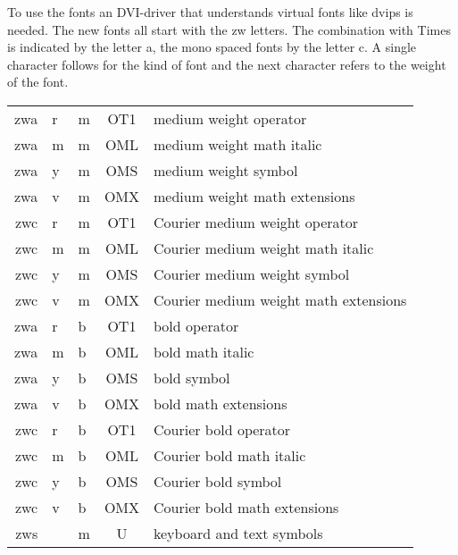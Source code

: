 \documentclass{article}
\begin{document}
To use the fonts an DVI-driver that understands virtual fonts like 
\textsf{dvips} is needed.
The new fonts all start with the \textsf{zw} letters. The combination
with Times is indicated by the letter \textsf{a}, the mono spaced fonts
by the letter \textsf{c}. A single 
character follows for the kind of font and the next character
refers to the weight of the font.
\begin{center}
\begin{tabular}{|rll | c | l|}
\hline\hline
\textsf{zwa}&\textsf{r}&\textsf{m} & OT1 & medium weight operator\\
\textsf{zwa}&\textsf{m}&\textsf{m} & OML & medium weight math italic\\
\textsf{zwa}&\textsf{y}&\textsf{m} & OMS & medium weight symbol\\
\textsf{zwa}&\textsf{v}&\textsf{m} & OMX & medium weight math extensions\\
\hline
\textsf{zwc}&\textsf{r}&\textsf{m} & OT1 & Courier medium weight operator\\
\textsf{zwc}&\textsf{m}&\textsf{m} & OML & Courier medium weight math italic\\
\textsf{zwc}&\textsf{y}&\textsf{m} & OMS & Courier medium weight symbol\\
\textsf{zwc}&\textsf{v}&\textsf{m} & OMX & Courier medium weight math extensions\\
\hline
\textsf{zwa}&\textsf{r}&\textsf{b} & OT1 & bold operator\\
\textsf{zwa}&\textsf{m}&\textsf{b} & OML & bold math italic\\
\textsf{zwa}&\textsf{y}&\textsf{b} & OMS & bold symbol\\
\textsf{zwa}&\textsf{v}&\textsf{b} & OMX & bold math extensions\\
\hline
\hline
\textsf{zwc}&\textsf{r}&\textsf{b} & OT1 & Courier bold operator\\
\textsf{zwc}&\textsf{m}&\textsf{b} & OML & Courier bold math italic\\
\textsf{zwc}&\textsf{y}&\textsf{b} & OMS & Courier bold symbol\\
\textsf{zwc}&\textsf{v}&\textsf{b} & OMX & Courier bold math extensions\\
\hline
\textsf{zws} & & \textsf{m}         &  U  &  keyboard and text symbols \\
\hline
\end{tabular}
\end{center}
\end{document}
